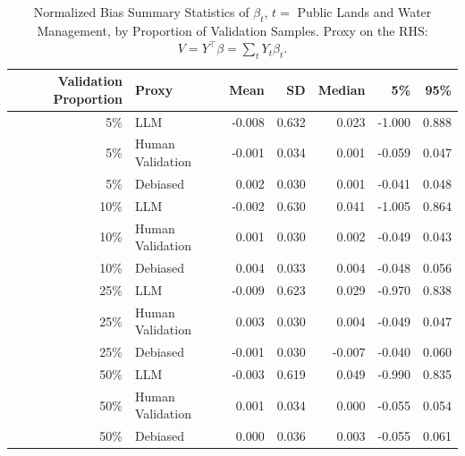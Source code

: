 \begin{table}

\caption{Normalized Bias Summary Statistics of $\beta_{t}$, $t=$ Public Lands and Water Management, by Proportion of Validation Samples.
      Proxy on the RHS: $V = Y^\top \beta = \sum_{t} Y_t \beta_t$.}
\centering
\begin{tabular}[t]{rlrrrrr}
\toprule
Validation Proportion & Proxy & Mean & SD & Median & 5\% & 95\%\\
\midrule
5\% & LLM & -0.008 & 0.632 & 0.023 & -1.000 & 0.888\\
5\% & Human Validation & -0.001 & 0.034 & 0.001 & -0.059 & 0.047\\
5\% & Debiased & 0.002 & 0.030 & 0.001 & -0.041 & 0.048\\
10\% & LLM & -0.002 & 0.630 & 0.041 & -1.005 & 0.864\\
10\% & Human Validation & 0.001 & 0.030 & 0.002 & -0.049 & 0.043\\
10\% & Debiased & 0.004 & 0.033 & 0.004 & -0.048 & 0.056\\
25\% & LLM & -0.009 & 0.623 & 0.029 & -0.970 & 0.838\\
25\% & Human Validation & 0.003 & 0.030 & 0.004 & -0.049 & 0.047\\
25\% & Debiased & -0.001 & 0.030 & -0.007 & -0.040 & 0.060\\
50\% & LLM & -0.003 & 0.619 & 0.049 & -0.990 & 0.835\\
50\% & Human Validation & 0.001 & 0.034 & 0.000 & -0.055 & 0.054\\
50\% & Debiased & 0.000 & 0.036 & 0.003 & -0.055 & 0.061\\
\bottomrule
\end{tabular}
\end{table}
